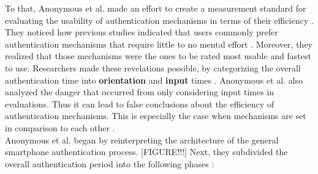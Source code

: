 To that, Anonymous et al. \cite{anonymous} made an effort to create a measurement standard for evaluating the usability of authentication mechanisms in terms of their efficiency \cite{anonymous}. They noticed how previous studies indicated that users commonly prefer authentication mechanisms that require little to no mental effort \cite{anonymous, AnatomySmartphone}. Moreover, they realized that those mechanisms were the ones to be rated most usable and fastest to use. Researchers made these revelations possible, by categorizing the overall authentication time into \textbf{orientation} and \textbf{input} times \cite{anonymous}. Anonymous et al. \cite{anonymous} also analyzed the danger that occurred from only considering input times in evaluations. Thus it can lead to false conclusions about the efficiency of authentication mechanisms. This is especially the case when mechanisms are set in comparison to each other \cite{anonymous}. \\

Anonymous et al. \cite{anonymous} began by reinterpreting the architecture of the general smartphone authentication process. [FIGURE!!!] Next, they subdivided the overall authentication period into the following phases \cite{anonymous}: 

